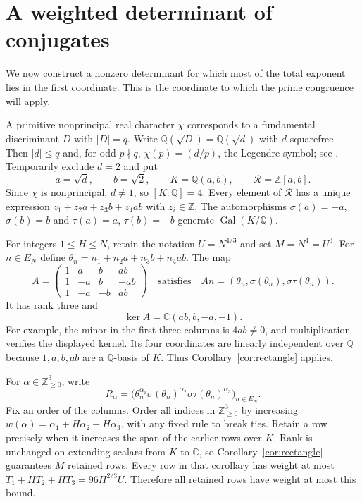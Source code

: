 \documentclass[11pt,a4paper]{amsart}
\theoremstyle{remark}
\newcommand{\Q}{\mathbb Q}
\newcommand{\Z}{\mathbb Z}
\newcommand{\C}{\mathbb C}
\newcommand{\N}{\mathbb Z_{\ge0}}
\newcommand{\cR}{\mathcal R}
\DeclareMathOperator{\Gal}{Gal}
\numberwithin{equation}{section}
\begin{document}
\section{A weighted determinant of conjugates}\label{sec:determinant}

We now construct a nonzero determinant for which most of the total
exponent lies in the first coordinate. This is the coordinate to
which the prime congruence will apply.

A primitive nonprincipal real character $\chi$ corresponds to a
fundamental discriminant $D$ with $|D|=q$. Write
$\Q(\sqrt D)=\Q(\sqrt d)$ with $d$ squarefree. Then
$|d|\le q$ and, for odd $p\nmid q$,
$\chi(p)=(d/p)$, the Legendre symbol; see \cite{Davenport}.
Temporarily exclude $d=2$ and put
\[
 a=\sqrt d,\qquad b=\sqrt2,\qquad K=\Q(a,b),\qquad
 \cR=\Z[a,b].
\]
Since $\chi$ is nonprincipal, $d\ne1$, so $[K:\Q]=4$.
Every element of $\cR$ has a unique expression
$z_1+z_2a+z_3b+z_4ab$ with $z_i\in\Z$.
The automorphisms $\sigma(a)=-a$, $\sigma(b)=b$ and
$\tau(a)=a$, $\tau(b)=-b$ generate $\Gal(K/\Q)$.

For integers $1\le H\le N$, retain the notation $U=N^{4/3}$ and set
$M=N^4=U^3$. For $n\in E_N$ define
$\theta_n=n_1+n_2a+n_3b+n_4ab$. The map
\begin{equation}\label{eq:A}
 A=\begin{pmatrix}
 1&a&b&ab\\1&-a&b&-ab\\1&-a&-b&ab
 \end{pmatrix}
 \quad\text{satisfies}\quad
 An=(\theta_n,\sigma(\theta_n),\sigma\tau(\theta_n)).
\end{equation}
It has rank three and
\[
 \ker A=\C(ab,b,-a,-1).
\]
For example, the minor in the first three columns is $4ab\ne0$,
and multiplication verifies the displayed kernel. Its four
coordinates are linearly independent over $\Q$ because
$1,a,b,ab$ are a $\Q$-basis of $K$. Thus
Corollary~\ref{cor:rectangle} applies.

For $\alpha\in\N^3$, write
\begin{equation}\label{eq:rows}
 R_\alpha=
 \bigl(\theta_n^{\alpha_1}\sigma(\theta_n)^{\alpha_2}
                   \sigma\tau(\theta_n)^{\alpha_3}\bigr)_{n\in E_N}.
\end{equation}
Fix an order of the columns. Order all indices in $\N^3$ by increasing
$w(\alpha)=\alpha_1+H\alpha_2+H\alpha_3$, with any fixed rule to
break ties. Retain a row precisely when it increases the span of
the earlier rows over $K$. Rank is unchanged on extending scalars
from $K$ to $\C$, so Corollary~\ref{cor:rectangle} guarantees $M$
retained rows. Every row in that corollary has weight at most
$T_1+HT_2+HT_3=96H^{2/3}U$. Therefore all retained rows have weight
at most this bound.
\end{document}

